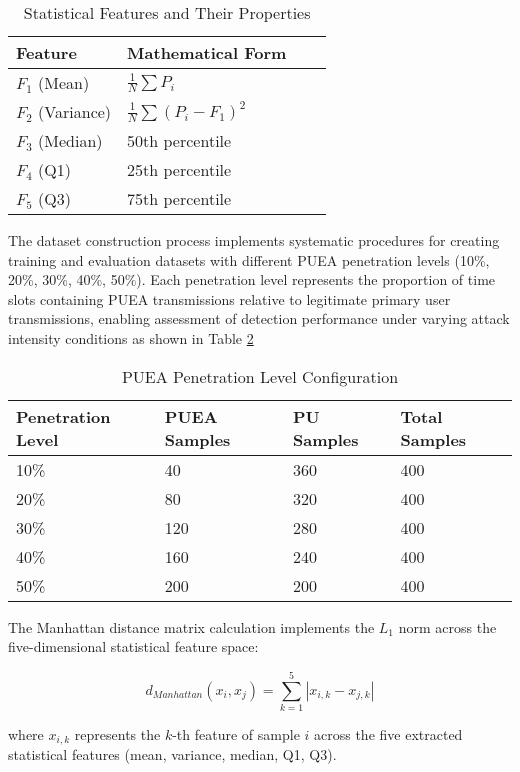 \begin{table}[h]
\centering
\caption{Statistical Features and Their Properties}
\label{tab:features}
\begin{tabular}{|l|l|l|l|}
\hline
\textbf{Feature} & \textbf{Mathematical Form} \\
\hline
$F_1$ (Mean) & $\frac{1}{N}\sum P_i$  \\
$F_2$ (Variance) & $\frac{1}{N}\sum (P_i - F_1)^2$  \\
$F_3$ (Median) & 50th percentile \\
$F_4$ (Q1) & 25th percentile  \\
$F_5$ (Q3) & 75th percentile \\
\hline
\end{tabular}
\end{table}

The dataset construction process implements systematic procedures for creating training and evaluation datasets with different PUEA penetration levels (10\%, 20\%, 30\%, 40\%, 50\%). Each penetration level represents the proportion of time slots containing PUEA transmissions relative to legitimate primary user transmissions, enabling assessment of detection performance under varying attack intensity conditions as shown in Table \ref{tab:penetration}

\begin{table}[h]
\centering
\caption{PUEA Penetration Level Configuration}
\label{tab:penetration}
\begin{tabular}{|l|l|l|l|}
\hline
\textbf{Penetration Level} & \textbf{PUEA Samples} & \textbf{PU Samples} & \textbf{Total Samples} \\
\hline
10\% & 40 & 360 & 400 \\
20\% & 80 & 320 & 400 \\
30\% & 120 & 280 & 400 \\
40\% & 160 & 240 & 400 \\
50\% & 200 & 200 & 400 \\
\hline
\end{tabular}
\end{table}

The Manhattan distance matrix calculation implements the $L_1$ norm across the five-dimensional statistical feature space:

\begin{equation}
d_{Manhattan}(x_i, x_j) = \sum_{k=1}^{5} |x_{i,k} - x_{j,k}|
\end{equation}

where $x_{i,k}$ represents the $k$-th feature of sample $i$ across the five extracted statistical features (mean, variance, median, Q1, Q3).

